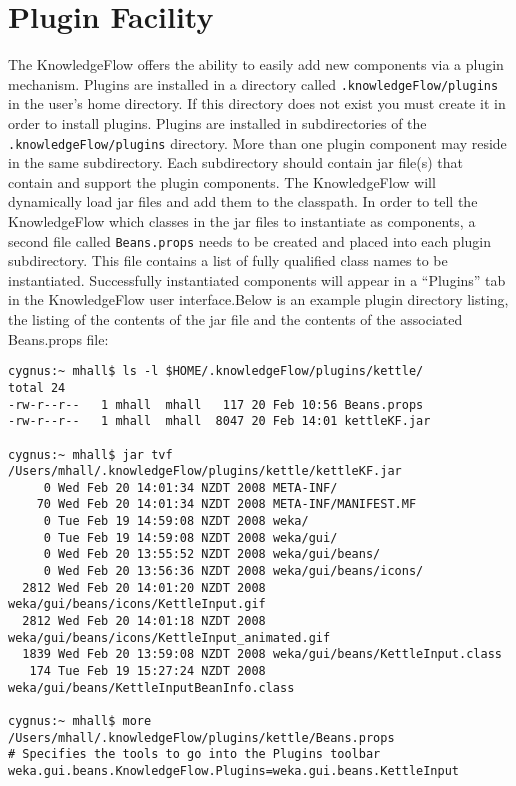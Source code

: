 \documentclass[a4paper]{article}
\begin{document}
\newpage
\section{Plugin Facility}

The KnowledgeFlow offers the ability to easily add new components via
a plugin mechanism. Plugins are installed in a directory called
\verb=.knowledgeFlow/plugins= in the user's home directory. If this
directory does not exist you must create it in order to install
plugins. Plugins are installed in subdirectories of the
\verb=.knowledgeFlow/plugins= directory. More than one plugin
component may reside in the same subdirectory. Each subdirectory
should contain jar file(s) that contain and support the plugin
components. The KnowledgeFlow will dynamically load jar files and add
them to the classpath. In order to tell the KnowledgeFlow which
classes in the jar files to instantiate as components, a second file
called \verb=Beans.props= needs to be created and placed into each
plugin subdirectory. This file contains a list of fully qualified
class names to be instantiated. Successfully instantiated components
will appear in a ``Plugins'' tab in the KnowledgeFlow user
interface.Below is an example plugin directory listing, the listing of
the contents of the jar file and the contents of the associated
Beans.props file:

\begin{verbatim}
cygnus:~ mhall$ ls -l $HOME/.knowledgeFlow/plugins/kettle/
total 24
-rw-r--r--   1 mhall  mhall   117 20 Feb 10:56 Beans.props
-rw-r--r--   1 mhall  mhall  8047 20 Feb 14:01 kettleKF.jar

cygnus:~ mhall$ jar tvf /Users/mhall/.knowledgeFlow/plugins/kettle/kettleKF.jar 
     0 Wed Feb 20 14:01:34 NZDT 2008 META-INF/
    70 Wed Feb 20 14:01:34 NZDT 2008 META-INF/MANIFEST.MF
     0 Tue Feb 19 14:59:08 NZDT 2008 weka/
     0 Tue Feb 19 14:59:08 NZDT 2008 weka/gui/
     0 Wed Feb 20 13:55:52 NZDT 2008 weka/gui/beans/
     0 Wed Feb 20 13:56:36 NZDT 2008 weka/gui/beans/icons/
  2812 Wed Feb 20 14:01:20 NZDT 2008 weka/gui/beans/icons/KettleInput.gif
  2812 Wed Feb 20 14:01:18 NZDT 2008 weka/gui/beans/icons/KettleInput_animated.gif
  1839 Wed Feb 20 13:59:08 NZDT 2008 weka/gui/beans/KettleInput.class
   174 Tue Feb 19 15:27:24 NZDT 2008 weka/gui/beans/KettleInputBeanInfo.class

cygnus:~ mhall$ more /Users/mhall/.knowledgeFlow/plugins/kettle/Beans.props 
# Specifies the tools to go into the Plugins toolbar
weka.gui.beans.KnowledgeFlow.Plugins=weka.gui.beans.KettleInput
\end{verbatim}
\end{document}
